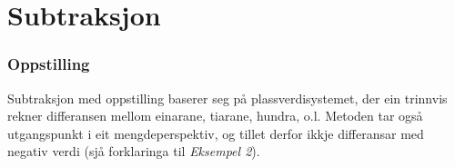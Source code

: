 \section{Subtraksjon}
\subsubsection{Oppstilling}
Subtraksjon med oppstilling baserer seg på plassverdisystemet, der ein trinnvis rekner differansen mellom einarane, tiarane, hundra, o.l. Metoden tar også utgangspunkt i eit mengdeperspektiv, og tillet derfor ikkje differansar med negativ verdi (sjå forklaringa til \textsl{Eksempel 2}).
\begin{center}
	\parbox{0.3\linewidth}{
} \qquad
\parbox{0.3\linewidth}{
} \\[12pt]
\parbox{0.3\linewidth}{
}\qquad
\parbox{0.3\linewidth}{
}

\end{center}
